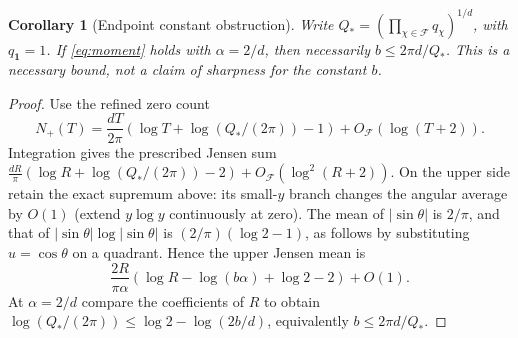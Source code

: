 \documentclass[11pt]{article}
\newtheorem{corollary}[theorem]{Corollary}
\theoremstyle{remark}\newtheorem{remark}[theorem]{Remark}
\newcommand{\spec}{\mathcal F}
\begin{document}
\begin{corollary}[Endpoint constant obstruction]\label{cor:constant}
Write $Q_*=(\prod_{\chi\in\spec}q_\chi)^{1/d}$, with $q_{\mathbf1}=1$. If \eqref{eq:moment} holds with $\alpha=2/d$, then necessarily $b\le 2\pi d/Q_*$. This is a necessary bound, not a claim of sharpness for the constant $b$.
\end{corollary}
\begin{proof}
Use the refined zero count
\[
 N_+(T)=\frac{dT}{2\pi}\left(\log T+\log(Q_*/(2\pi))-1\right)+O_{\spec}(\log(T+2)).
\]
Integration gives the prescribed Jensen sum $\frac{dR}{\pi}(\log R+\log(Q_*/(2\pi))-2)+O_{\spec}(\log^2(R+2))$. On the upper side retain the exact supremum above: its small-$y$ branch changes the angular average by $O(1)$ (extend $y\log y$ continuously at zero). The mean of $|\sin\theta|$ is $2/\pi$, and that of $|\sin\theta|\log|\sin\theta|$ is $(2/\pi)(\log2-1)$, as follows by substituting $u=\cos\theta$ on a quadrant. Hence the upper Jensen mean is
\[
 \frac{2R}{\pi\alpha}\left(\log R-\log(b\alpha)+\log2-2\right)+O(1).
\]
At $\alpha=2/d$ compare the coefficients of $R$ to obtain $\log(Q_*/(2\pi))\le \log2-\log(2b/d)$, equivalently $b\le2\pi d/Q_*$.
\end{proof}
\end{document}
